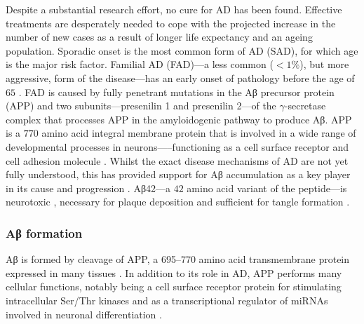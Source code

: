 Despite a substantial research effort, no cure for AD has been found.
Effective treatments are desperately needed to cope with the projected increase in the number of new cases as a result of longer life expectancy and an ageing population.
Sporadic onset is the most common form of AD (SAD), for which age is the major risk factor.
Familial AD (FAD)---a less common ($<1\%$), but more aggressive, form of the disease---has an early onset of pathology before the age of $65$ \cite{VanCauwenberghe2016}.
FAD is caused by fully penetrant mutations in the Aβ precursor protein (APP) and two subunits---presenilin 1 and presenilin 2---of the $\gamma$-secretase complex that processes APP in the amyloidogenic pathway to produce Aβ.
APP is a $770$ amino acid integral membrane protein that is involved in a wide range of developmental processes in neurons—--functioning as a cell surface receptor and cell adhesion molecule \cite{Muller2017}.
Whilst the exact disease mechanisms of AD are not yet fully understood, this has provided support for Aβ accumulation as a key player in its cause and progression \cite{Lane2018}.
Aβ42---a $42$ amino acid variant of the peptide---is neurotoxic \cite{Zhang2002}, necessary for plaque deposition \cite{McGowan2005} and sufficient for tangle formation \cite{Gotz2001}.

\subsubsection{Aβ formation}

Aβ is formed by cleavage of APP, a \numrange{695}{770} amino acid transmembrane protein
expressed in many tissues \cite{Uhlen2015}.
In addition to its role in AD, APP performs many cellular functions,
notably being a cell surface receptor protein for stimulating intracellular Ser/Thr kinases
\cite{Murayama1996} and as a transcriptional regulator of miRNAs involved in
neuronal differentiation \cite{Shu2015}.

